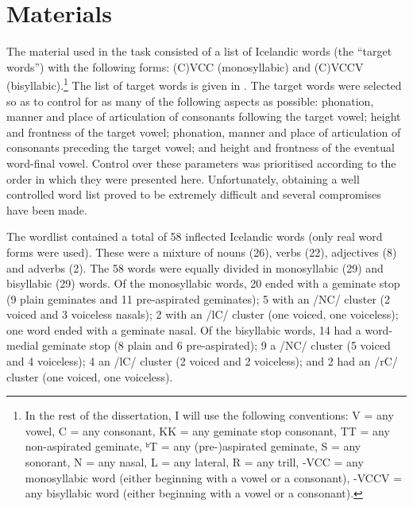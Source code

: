 \documentclass[11pt,a4paper,openany]{memoir}\usepackage[]{graphicx}\usepackage[]{color}
\begin{document}

\section{Materials}
\label{s:materials}
The material used in the task consisted of a list of Icelandic words (the ``target words'') with the following forms: (C)VCC (monosyllabic) and (C)VCCV (bisyllabic).\footnote{In the rest of the dissertation, I will use the following conventions: V = any vowel, C = any consonant, KK = any geminate stop consonant, TT = any non-aspirated geminate, ʰT = any (pre-)aspirated geminate, S = any sonorant, N = any nasal, L = any lateral, R = any trill, -VCC = any monosyllabic word (either beginning with a vowel or a consonant), -VCCV = any bisyllabic word (either beginning with a vowel or a consonant).}
The list of target words is given in .
The target words were selected so as to control for as many of the following aspects as possible: phonation, manner and place of articulation of consonants following the target vowel; height and frontness of the target vowel; phonation, manner and place of articulation of consonants preceding the target vowel; and height and frontness of the eventual word-final vowel.
Control over these parameters was prioritised according to the order in which they were presented here.
Unfortunately, obtaining a well controlled word list proved to be extremely difficult and several compromises have been made.

The wordlist contained a total of 58 inflected Icelandic words (only real word forms were used).
These were a mixture of nouns (26), verbs (22), adjectives (8) and adverbs (2).
The 58 words were equally divided in monosyllabic (29) and bisyllabic (29) words.
Of the monosyllabic words, 20 ended with a geminate stop (9 plain geminates and 11 pre-aspirated geminates); 5 with an /NC/ cluster (2 voiced and 3 voiceless nasals); 2 with an /lC/ cluster (one voiced, one voiceless); one word ended with a geminate nasal.
Of the bisyllabic words, 14 had a word-medial geminate stop (8 plain and 6 pre-aspirated); 9 a /NC/ cluster (5 voiced and 4 voiceless); 4 an /lC/ cluster (2 voiced and 2 voiceless); and 2 had an /rC/ cluster (one voiced, one voiceless).
\end{document}
